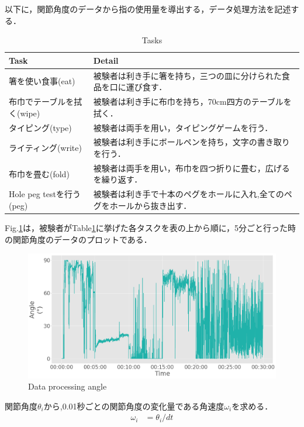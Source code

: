以下に，関節角度のデータから指の使用量を導出する，データ処理方法を記述する．
\begin{table}[H]
  \caption{Tasks}
  \label{table:tasks}
  \centering
  \begin{tabular}{ll}
    \hline
    Task &  Detail  \\
    \hline \hline
箸を使い食事(eat)&
被験者は利き手に箸を持ち，三つの皿に分けられた食品を口に運び食す．\\

布巾でテーブルを拭く(wipe)&
被験者は利き手に布巾を持ち，70cm四方のテーブルを拭く．\\

タイピング(type)&
被験者は両手を用い，タイピングゲームを行う．\\

ライティング(write)&
被験者は利き手にボールペンを持ち，文字の書き取りを行う．\\

布巾を畳む(fold)&
被験者は両手を用い，布巾を四つ折りに畳む，広げるを繰り返す．\\

Hole peg testを行う(peg)&
被験者は利き手で十本のペグをホールに入れ,全てのペグをホールから抜き出す．\\

    \hline
  \end{tabular}
\end{table}


Fig.\ref{fig:angle}は，被験者がTable\ref{table:tasks}に挙げた各タスクを表の上から順に，5分ごと行った時の関節角度のデータのプロットである．

\begin{figure}[H]
  \centering
  \includegraphics[width=0.8\linewidth]{fig/angle_}
  \caption{Data processing angle}
  \label{fig:angle}
\end{figure}

関節角度$\theta_i$から,0.01秒ごとの関節角度の変化量である角速度$\omega_i$を求める．
\begin{eqnarray}
\omega_i & = \theta_i /dt
\end{eqnarray}

